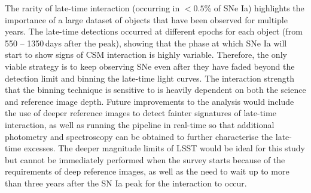 \documentclass[a4paper,oneside,12pt, class=Latex/Classes/PhDthesisPSnPDF, crop=false]{standalone}
\begin{document}
The rarity of late-time interaction (occurring in $<0.5$\% of SNe Ia) highlights the importance of a large dataset of objects that have been observed for multiple years. The late-time detections occurred at different epochs for each object (from 550 -- 1350\,days after the peak), showing that the phase at which SNe Ia will start to show signs of CSM interaction is highly variable. Therefore, the only viable strategy is to keep observing SNe even after they have faded beyond the detection limit and binning the late-time light curves. The interaction strength that the binning technique is sensitive to is heavily dependent on both the science and reference image depth. Future improvements to the analysis would include the use of deeper reference images to detect fainter signatures of late-time interaction, as well as running the pipeline in real-time so that additional photometry and spectroscopy can be obtained to further characterise the late-time excesses. The deeper magnitude limits of LSST would be ideal for this study but cannot be immediately performed when the survey starts because of the requirements of deep reference images, as well as the need to wait up to more than three years after the SN Ia peak for the interaction to occur.
\end{document}
